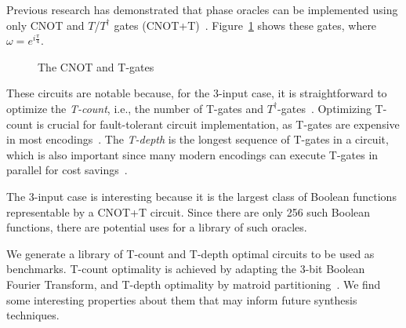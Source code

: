 \documentclass[a4paper]{article}
\makeatletter
\newcommand{\sublabel}[1]{\protected@edef\@currentlabel{\thefigure(\thesubfigure)}\label{#1}}
\makeatother
\begin{document}
Previous research has demonstrated that phase oracles can be implemented using only CNOT and $T$/$T^{\dagger}$ gates (CNOT+T)~\cite{bib-amy-cnot}. Figure~\ref{fig-gates} shows these gates, where $\omega = e^{i\frac{\pi}{4}}$.

\vspace{0.3cm}

\begin{figure}[t]
  \begin{minipage}{0.45\linewidth}
    \centering
    \scalebox{1.0} {
      
    }
    \sublabel{fig-sgate}
    \scalebox{1.0} {
      
    }
    \sublabel{fig-sdgate}
    \scalebox{1.0}{
      
    }
    \sublabel{fig-cnot}
  \end{minipage}
  \begin{minipage}{0.45\linewidth}
  \centering
    \scalebox{1.0} {
      
    }
    \sublabel{fig-tgate}
    \scalebox{1.0} {
      
    }
    \sublabel{fig-tdgate}
    \vspace{2cm}
  \end{minipage}
  \caption{The CNOT and T-gates}
  \label{fig-gates}
\end{figure}

\vspace{0.3cm}

These circuits are notable because, for the 3-input case, it is straightforward to optimize the {\it T-count}, i.e., the number of T-gates and $T^{\dagger}$-gates~\cite{amy-meet-in-middle}. Optimizing T-count is crucial for fault-tolerant circuit implementation, as T-gates are expensive in most encodings~\cite{bib-herr-lattice,bib-fowler-bridge}. The {\it T-depth} is the longest sequence of T-gates in a circuit, which is also important since many modern encodings can execute T-gates in parallel for cost savings~\cite{bib-google-ecc}.

\vspace{0.3cm}

The 3-input case is interesting because it is the largest class of Boolean functions representable by a CNOT+T circuit. Since there are only 256 such Boolean functions, there are potential uses for a library of such oracles.

\vspace{0.3cm}

We generate a library of T-count and T-depth optimal circuits to be used as benchmarks. T-count optimality is achieved by adapting the 3-bit Boolean Fourier Transform, and T-depth optimality by matroid partitioning~\cite{bib-amy-matroid}. We find some interesting properties about them that may inform future synthesis techniques.
\end{document}
